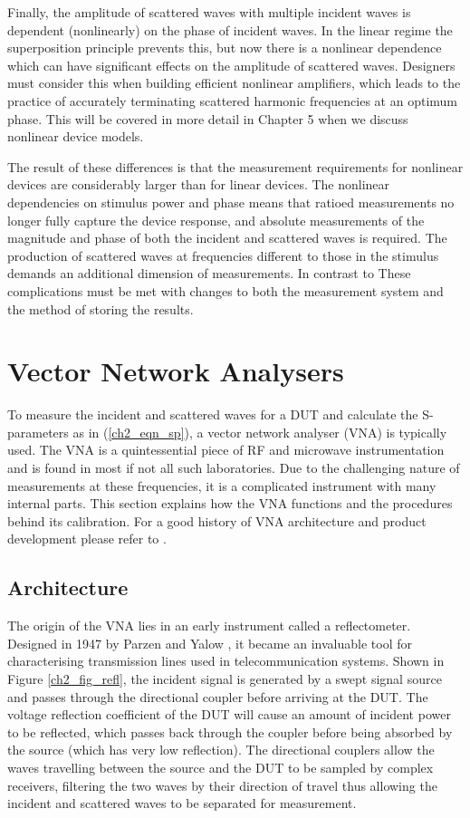\documentclass[../thesis/thesis.tex]{subfiles}
\begin{document}
\begin{refsection}
Finally, the amplitude of scattered waves with multiple incident waves is dependent (nonlinearly) on the phase of incident waves. In the linear regime the superposition principle prevents this, but now there is a nonlinear dependence which can have significant effects on the amplitude of scattered waves. Designers must consider this when building efficient nonlinear amplifiers, which leads to the practice of accurately terminating scattered harmonic frequencies at an optimum phase. This will be covered in more detail in Chapter 5 when we discuss nonlinear device models. 

The result of these differences is that the measurement requirements for nonlinear devices are considerably larger than for linear devices. The nonlinear dependencies on stimulus power and phase means that ratioed measurements no longer fully capture the device response, and absolute measurements of the magnitude and phase of both the incident and scattered waves is required. The production of scattered waves at frequencies different to those in the stimulus demands an additional dimension of measurements. In contrast to These complications must be met with changes to both the measurement system and the method of storing the results.

\section{Vector Network Analysers}

To measure the incident and scattered waves for a DUT and calculate the S-parameters as in (\ref{ch2_eqn_sp}), a vector network analyser (VNA) is typically used. The VNA is a quintessential piece of RF and microwave instrumentation and is found in most if not all such laboratories. Due to the challenging nature of measurements at these frequencies, it is a complicated instrument with many internal parts. This section explains how the VNA functions and the procedures behind its calibration. For a good history of VNA architecture and product development please refer to \cite{Teppati_2013,Dunsmore_2012}.

\subsection{Architecture}

The origin of the VNA lies in an early instrument called a reflectometer. Designed in 1947 by Parzen and Yalow \cite{Parzen_1947}, it became an invaluable tool for characterising transmission lines used in telecommunication systems. Shown in Figure \ref{ch2_fig_refl}, the incident signal is generated by a swept signal source and passes through the directional coupler before arriving at the DUT. The voltage reflection coefficient of the DUT will cause an amount of incident power to be reflected, which passes back through the coupler before being absorbed by the source (which has very low reflection). The directional couplers allow the waves travelling between the source and the DUT to be sampled by complex receivers, filtering the two waves by their direction of travel thus allowing the incident and scattered waves to be separated for measurement. 


\end{refsection}
\end{document}
